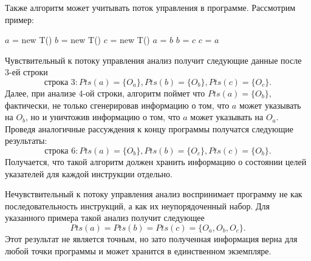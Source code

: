 \documentclass[14pt,titlepage]{extarticle}
\newenvironment{fresh}{\color{blue}}{\color{black}}
\begin{document}
    \begin{fresh}

    Также алгоритм может учитывать поток управления в программе. Рассмотрим
    пример:
    \begin{algorithmic}[1]
    \STATE $a$ = new T()
    \STATE $b$ = new T()
    \STATE $c$ = new T()
    \STATE $a$ = $b$
    \STATE $b$ = $c$
    \STATE $c$ = $a$
    \end{algorithmic}

    Чувствительный к потоку управления анализ получит следующие данные после
    3-ей строки
    \[\textrm{строка 3}:
        Pts(a) = \{O_a\}, Pts(b) = \{O_b\}, Pts(c) = \{O_c\}.\]
    Далее, при анализе 4-ой строки, алгоритм поймет что $Pts(a) = \{O_b\}$,
    фактически, не только сгенерировав информацию о том, что $a$ может
    указывать на $O_b$, но и уничтожив информацию о том, что $a$ может
    указывать на $O_a$.
    Проведя аналогичные рассуждения к концу программы получатся следующие
    результаты:
    \[\textrm{строка 6}:
        Pts(a) = \{O_b\}, Pts(b) = \{O_c\}, Pts(c) = \{O_b\}.\]
    Получается, что такой алгоритм должен хранить информацию о состоянии целей
    указателей для каждой инструкции отдельно.

    Нечувствительный к потоку управления анализ воспринимает программу не как
    последовательность инструкций, а как их неупорядоченный набор.
    Для указанного примера такой анализ получит следующее
    \[Pts(a) = Pts(b) = Pts(c) = \{O_a, O_b, O_c\}.\]
    Этот результат не является точным, но зато полученная информация верна для
    любой точки программы и может хранится в единственном экземпляре.

    \end{fresh}
\end{document}
